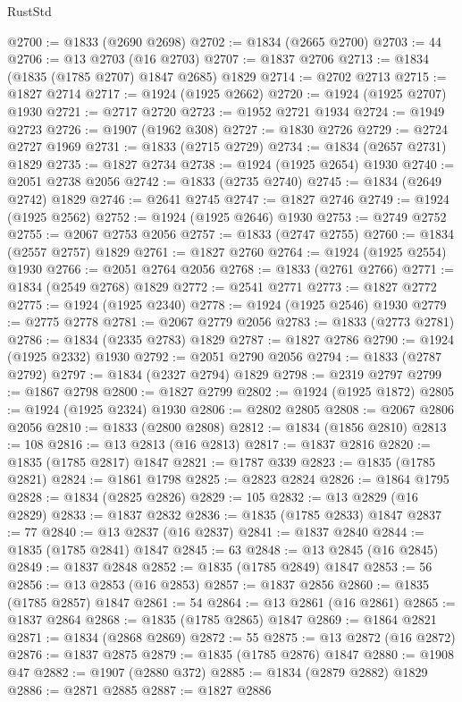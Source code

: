 \begin{lexlean}{RustStd}
\begin{coremodule}
{\begin{coremodule}
{{{{{@2700 := @1833 (@2690 @2698)
@2702 := @1834 (@2665 @2700)
@2703 := 44
@2706 := @13 @2703 (@16 @2703)
@2707 := @1837 @2706
@2713 := @1834 (@1835 (@1785 @2707) @1847 @2685) @1829
@2714 := @2702 @2713
@2715 := @1827 @2714
@2717 := @1924 (@1925 @2662)
@2720 := @1924 (@1925 @2707) @1930
@2721 := @2717 @2720
@2723 := @1952 @2721 @1934
@2724 := @1949 @2723
@2726 := @1907 (@1962 @308)
@2727 := @1830 @2726
@2729 := @2724 @2727 @1969
@2731 := @1833 (@2715 @2729)
@2734 := @1834 (@2657 @2731) @1829
@2735 := @1827 @2734
@2738 := @1924 (@1925 @2654) @1930
@2740 := @2051 @2738 @2056
@2742 := @1833 (@2735 @2740)
@2745 := @1834 (@2649 @2742) @1829
@2746 := @2641 @2745
@2747 := @1827 @2746
@2749 := @1924 (@1925 @2562)
@2752 := @1924 (@1925 @2646) @1930
@2753 := @2749 @2752
@2755 := @2067 @2753 @2056
@2757 := @1833 (@2747 @2755)
@2760 := @1834 (@2557 @2757) @1829
@2761 := @1827 @2760
@2764 := @1924 (@1925 @2554) @1930
@2766 := @2051 @2764 @2056
@2768 := @1833 (@2761 @2766)
@2771 := @1834 (@2549 @2768) @1829
@2772 := @2541 @2771
@2773 := @1827 @2772
@2775 := @1924 (@1925 @2340)
@2778 := @1924 (@1925 @2546) @1930
@2779 := @2775 @2778
@2781 := @2067 @2779 @2056
@2783 := @1833 (@2773 @2781)
@2786 := @1834 (@2335 @2783) @1829
@2787 := @1827 @2786
@2790 := @1924 (@1925 @2332) @1930
@2792 := @2051 @2790 @2056
@2794 := @1833 (@2787 @2792)
@2797 := @1834 (@2327 @2794) @1829
@2798 := @2319 @2797
@2799 := @1867 @2798
@2800 := @1827 @2799
@2802 := @1924 (@1925 @1872)
@2805 := @1924 (@1925 @2324) @1930
@2806 := @2802 @2805
@2808 := @2067 @2806 @2056
@2810 := @1833 (@2800 @2808)
@2812 := @1834 (@1856 @2810)
@2813 := 108
@2816 := @13 @2813 (@16 @2813)
@2817 := @1837 @2816
@2820 := @1835 (@1785 @2817) @1847
@2821 := @1787 @339
@2823 := @1835 (@1785 @2821)
@2824 := @1861 @1798
@2825 := @2823 @2824
@2826 := @1864 @1795
@2828 := @1834 (@2825 @2826)
@2829 := 105
@2832 := @13 @2829 (@16 @2829)
@2833 := @1837 @2832
@2836 := @1835 (@1785 @2833) @1847
@2837 := 77
@2840 := @13 @2837 (@16 @2837)
@2841 := @1837 @2840
@2844 := @1835 (@1785 @2841) @1847
@2845 := 63
@2848 := @13 @2845 (@16 @2845)
@2849 := @1837 @2848
@2852 := @1835 (@1785 @2849) @1847
@2853 := 56
@2856 := @13 @2853 (@16 @2853)
@2857 := @1837 @2856
@2860 := @1835 (@1785 @2857) @1847
@2861 := 54
@2864 := @13 @2861 (@16 @2861)
@2865 := @1837 @2864
@2868 := @1835 (@1785 @2865) @1847
@2869 := @1864 @2821
@2871 := @1834 (@2868 @2869)
@2872 := 55
@2875 := @13 @2872 (@16 @2872)
@2876 := @1837 @2875
@2879 := @1835 (@1785 @2876) @1847
@2880 := @1908 @47
@2882 := @1907 (@2880 @372)
@2885 := @1834 (@2879 @2882) @1829
@2886 := @2871 @2885
@2887 := @1827 @2886
}}}}}
\end{coremodule}}
\end{coremodule}
\end{lexlean}
